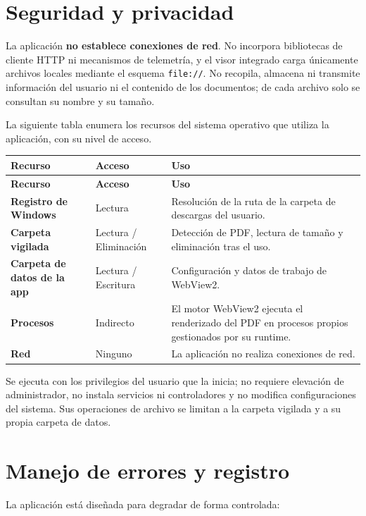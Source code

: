 \documentclass[11pt,a4paper]{article}
\begin{document}
\section{Seguridad y privacidad}
La aplicación \textbf{no establece conexiones de red}. No incorpora bibliotecas
de cliente HTTP ni mecanismos de telemetría, y el visor integrado carga
únicamente archivos locales mediante el esquema \texttt{file://}. No recopila,
almacena ni transmite información del usuario ni el contenido de los documentos;
de cada archivo solo se consultan su nombre y su tamaño.

La siguiente tabla enumera los recursos del sistema operativo que utiliza la
aplicación, con su nivel de acceso.

\begin{xltabular}{\textwidth}{@{} >{\bfseries}p{4.3cm} p{2.8cm} L @{}}
\toprule
\normalfont\textbf{Recurso} & \textbf{Acceso} & \textbf{Uso} \\
\midrule
\endfirsthead
\toprule
\normalfont\textbf{Recurso} & \textbf{Acceso} & \textbf{Uso} \\
\midrule
\endhead
\bottomrule
\endfoot
Registro de Windows & Lectura & Resolución de la ruta de la carpeta de descargas del usuario. \\
Carpeta vigilada & Lectura / Eliminación & Detección de PDF, lectura de tamaño y eliminación tras el uso. \\
Carpeta de datos de la app & Lectura / Escritura & Configuración y datos de trabajo de WebView2. \\
Procesos & Indirecto & El motor WebView2 ejecuta el renderizado del PDF en procesos propios gestionados por su runtime. \\
Red & Ninguno & La aplicación no realiza conexiones de red. \\
\bottomrule
\end{xltabular}

Se ejecuta con los privilegios del usuario que la inicia; no requiere elevación
de administrador, no instala servicios ni controladores y no modifica
configuraciones del sistema. Sus operaciones de archivo se limitan a la carpeta
vigilada y a su propia carpeta de datos.

\section{Manejo de errores y registro}
La aplicación está diseñada para degradar de forma controlada:
\end{document}
